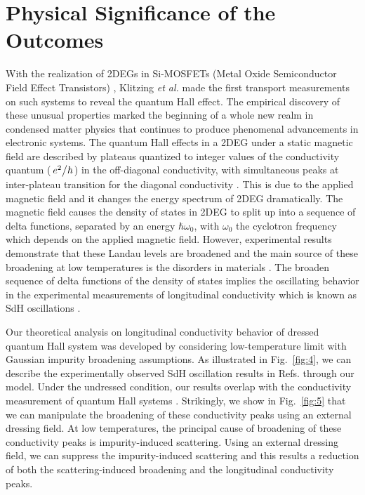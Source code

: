 \documentclass[
 reprint,
 amsmath,amssymb,
 aps,
 prb,
]{revtex4-2}
\begin{document}
{\color{Red}
\section{\label{sec:physical_significance} Physical Significance of the Outcomes}
With the realization of 2DEGs in Si-MOSFETs (Metal Oxide Semiconductor Field Effect Transistors) \citep{fowler66}, Klitzing \textit{et al.} \cite{klitzing80} made the first transport measurements on such systems to reveal the quantum Hall effect. The empirical discovery of these unusual properties marked the beginning of a whole new realm in condensed matter physics that continues to produce phenomenal advancements in electronic systems. The quantum Hall effects in a 2DEG under a static magnetic field are described by plateaus quantized to integer values of the conductivity quantum ($\flatfrac{e^2}{\hbar}$) in the off-diagonal conductivity, with simultaneous peaks at inter-plateau transition for the diagonal conductivity \cite{endo09}. This is due to the applied magnetic field and it changes the energy spectrum of 2DEG dramatically. The magnetic field causes the density of states in 2DEG to split up into a sequence of delta functions, separated by an energy $\hbar\omega_0$, with $\omega_0$ the cyclotron frequency which depends on the applied magnetic field.
However, experimental results demonstrate that these Landau levels are broadened and the main source of these broadening at low temperatures is the disorders in materials \cite{ando85,dial07}. The broaden sequence of delta functions of the density of states implies the oscillating behavior in the experimental measurements of longitudinal conductivity which is known as SdH oscillations \cite{endo09,wakabayashi78}.

Our theoretical analysis on longitudinal conductivity behavior of dressed quantum Hall system was developed by considering low-temperature limit with Gaussian impurity broadening assumptions.
As illustrated in Fig.~\ref{fig:4}, we can describe the experimentally observed SdH oscillation results in Refs.\cite{endo09,wakabayashi78} through our model.
Under the undressed condition, our results overlap with the conductivity measurement of quantum Hall systems \cite{endo09}. Strikingly, we show in Fig.~\ref{fig:5} that we can manipulate the broadening of these conductivity peaks using an external dressing field. At low temperatures, the principal cause of broadening of these conductivity peaks is impurity-induced scattering. Using an external dressing field, we can suppress the impurity-induced scattering and this results a reduction of both the scattering-induced broadening and the longitudinal conductivity peaks.

}
\end{document}
